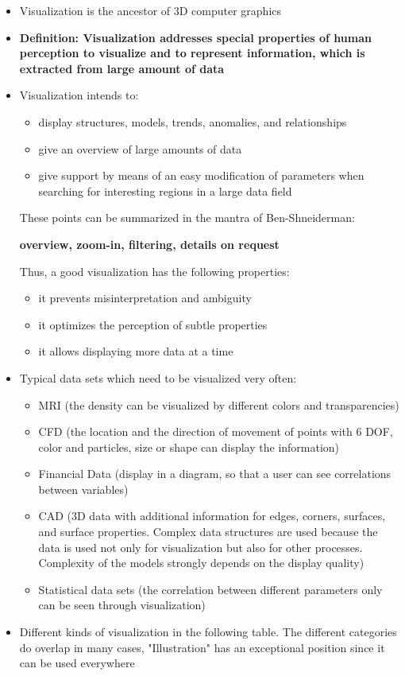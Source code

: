 \documentclass[12pt]{article}
\begin{document}
\begin{itemize}
	\item Visualization is the ancestor of 3D computer graphics
	\item \textbf {Definition: Visualization addresses special properties of human perception to visualize and to represent information, which is extracted from large amount of data}
	\item Visualization intends to:
	\begin{itemize}
		\item display structures, models, trends, anomalies, and relationships
		\item give an overview of large amounts of data
		\item give support by means of an easy modification of parameters when searching for interesting regions in a large data field
	\end{itemize}
	These points can be summarized in the mantra of Ben-Shneiderman:
	\begin{center}
	\textbf{overview, zoom-in, filtering, details on request}
	\end{center}
	Thus, a good visualization has the following properties:
	\begin{itemize}
		\item it prevents misinterpretation and ambiguity
		\item it optimizes the perception of subtle properties
		\item it allows displaying more data at a time
	\end{itemize}
	\item Typical data sets which need to be visualized very often:
	\begin{itemize}
		\item MRI (the density can be visualized by different colors and transparencies)
		\item CFD (the location and the direction of movement of points with 6 DOF, color and particles, size or shape can display the information)
		\item Financial Data (display in a diagram, so that a user can see correlations between variables)
		\item CAD (3D data with additional information for edges, corners, surfaces, and surface properties. Complex data structures are used because the data is used not only for visualization but also for other processes. Complexity of the models strongly depends on the display quality)
		\item Statistical data sets (the correlation between different parameters only can be seen through visualization)
	\end{itemize}
	\item Different kinds of visualization in the following table. The different categories do overlap in many cases, "Illustration" has an exceptional position since it can be used everywhere
\end{itemize}
\end{document}
